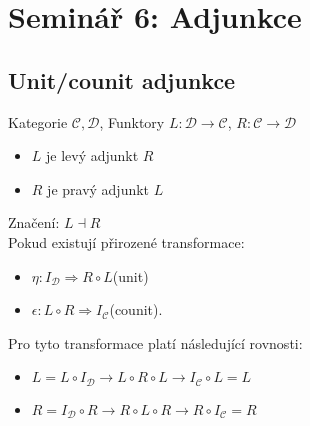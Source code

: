 \documentclass{article}
\begin{document}
\section*{Seminář 6: Adjunkce}
\subsection*{Unit/counit adjunkce}
Kategorie $\mathcal{C}, \mathcal{D}$, Funktory $L:\mathcal{D} \to \mathcal{C}$, $R:\mathcal{C} \to \mathcal{D}$
\begin{itemize}
    \setlength\itemsep{0em}
    \item $L$ je levý adjunkt $R$
    \item $R$ je pravý adjunkt $L$
\end{itemize}
Značení: $L \dashv{} R$\\
Pokud existují přirozené transformace:
\begin{itemize}
    \setlength\itemsep{0em}
    \item $\eta:I_\mathcal{D} \Rightarrow R \circ L$(unit)
    \item $\epsilon:L \circ R \Rightarrow I_\mathcal{C}$(counit).
\end{itemize}
\begin{center}
\end{center}
Pro tyto transformace platí následující rovnosti:
\begin{itemize}
    \setlength\itemsep{0em}
    \item $L = L \circ I_\mathcal{D} \to L \circ R \circ L \to I_\mathcal{C} \circ L = L$
    \item $R = I_\mathcal{D} \circ R \to R \circ L \circ R \to R \circ I_\mathcal{C} = R$
\end{itemize}
\end{document}

